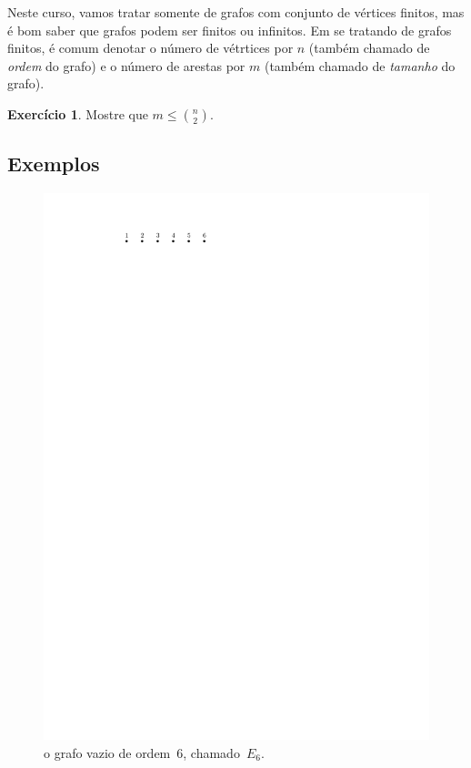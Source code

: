 \documentclass[12pt, a4paper]{article}
\theoremstyle{definition}
\newtheorem{exer}{Exercício}
\begin{document}
Neste curso, vamos tratar somente de grafos com conjunto de vértices finitos, mas é bom saber que grafos podem ser finitos ou infinitos. Em se tratando de grafos finitos, é comum denotar o número de vétrtices por $n$ (também chamado de \emph{ordem} do grafo) e o número de arestas por $m$ (também chamado de \emph{tamanho} do grafo). 

\begin{exer}
Mostre que $m \leq \binom{n}{2}$.
\end{exer}

\subsection{Exemplos}

\begin{figure}[H]
    \centering
    \includegraphics{vazio.pdf}
    \caption{o grafo vazio de ordem~$6$, chamado~$E_6$.}
    \label{fig:vazio}
\end{figure}
\end{document}
